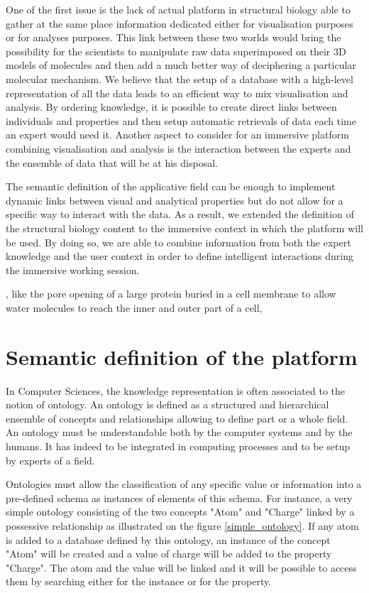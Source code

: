 \documentclass{vgtc}                          %
\begin{document}
One of the first issue is the lack of actual platform in structural biology able to gather at the same place information dedicated either for visualisation purposes or for analyses purposes. This link between these two worlds would bring the possibility for the scientists to manipulate raw data superimposed on their 3D models of molecules and then add a much better way of deciphering a particular molecular mechanism.
We believe that the setup of a database with a high-level representation of all the data leads to an efficient way to mix visualisation and analysis. By ordering knowledge, it is possible to create direct links between individuals and properties and then setup automatic retrievals of data each time an expert would need it.
Another aspect to consider for an immersive platform combining visualisation and analysis is the interaction between the experts and the ensemble of data that will be at his disposal.

The semantic definition of the applicative field can be enough to implement dynamic links between visual and analytical properties but do not allow for a specific way to interact with the data. As a result, we extended the definition of the structural biology content to the immersive context in which the platform will be used.
By doing so, we are able to combine information from both the expert knowledge and the user context in order to define intelligent interactions during the immersive working session.


, like the pore opening of a large protein buried in a cell membrane to allow water molecules to reach the inner and outer part of a cell, 

\section{Semantic definition of the platform}

In Computer Sciences, the knowledge representation is often associated to the notion of ontology. An ontology is defined as a structured and hierarchical ensemble of concepts and relationships allowing to define part or a whole field. An ontology must be understandable both by the computer systems and by the humans. It has indeed to be integrated in computing processes and to be setup by experts of a field.

Ontologies must allow the classification of any specific value or information into a pre-defined schema as instances of elements of this schema. For instance, a very simple ontology consisting of the two concepts "Atom" and "Charge" linked by a possessive relationship as illustrated on the figure \ref{simple_ontology}.
If any atom is added to a database defined by this ontology, an instance of the concept "Atom" will be created and a value of charge will be added to the property "Charge". The atom and the value will be linked and it will be possible to access them by searching either for the instance or for the property.
\end{document}
